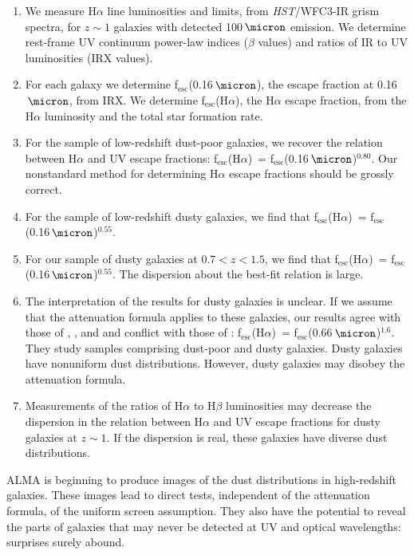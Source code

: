 \documentclass[preprint]{aastex}
\newcommand{\alephuv}{f$_{\mathrm{esc}}$(0.16$\,\micron$)}
\newcommand{\alephha}{f$_{\mathrm{esc}}$(H$\alpha$)}
\newcommand{\alephuvha}{f$_{\mathrm{esc}}$(0.66$\,\micron$)}
\begin{document}
\begin{enumerate}
\item We measure H$\alpha$ line luminosities and limits, from
\emph{HST}/WFC3-IR grism spectra, for $z \sim 1$ galaxies with detected
100$\,\micron$ emission.  We determine rest-frame UV continuum power-law
indices ($\beta$ values) and ratios of IR to UV luminosities (IRX values).
\item For each galaxy we determine \alephuv, the escape fraction at
0.16$\,\micron$, from IRX.  We determine \alephha, the H$\alpha$ escape
fraction, from the H$\alpha$ luminosity and the total star formation rate.
\item For the \citet{overzier11} sample of low-redshift dust-poor galaxies, we
recover the \citet{calzetti97b} relation between H$\alpha$ and UV escape
fractions: \alephha~= \alephuv$^{0.80}$.  Our nonstandard method for determining
H$\alpha$ escape fractions should be grossly correct.
\item For the \citet{hwang13} sample of low-redshift dusty galaxies, we find
that \alephha~= \alephuv$^{0.55}$.
\item For our sample of dusty galaxies at $0.7 < z < 1.5$, we find that
\alephha~= \alephuv$^{0.55}$.  The dispersion about the best-fit relation is
large.
\item The interpretation of the results for dusty galaxies is unclear.  If we
assume that the \citet{calzetti00} attenuation formula applies to these
galaxies, our results agree with those of \citet{onodera10}, \citet{kashino13},
and \citet{price13} and conflict with those of \citet{erb06}: \alephha~=
\alephuvha$^{1.6}$.  They study
samples comprising dust-poor and dusty galaxies.  Dusty galaxies have
nonuniform dust distributions.  However, dusty galaxies may disobey the
\citet{calzetti00} attenuation formula.
\item Measurements of the ratios of H$\alpha$ to H$\beta$ luminosities may
decrease the dispersion in the relation between H$\alpha$ and UV escape
fractions for dusty galaxies at $z \sim 1$.  If the dispersion is real, these
galaxies have diverse dust distributions.
\end{enumerate}

ALMA is beginning to produce images of the dust distributions in high-redshift
galaxies.  These images lead to direct tests, independent of the attenuation
formula, of the uniform screen assumption.  They also have the potential to
reveal the parts of galaxies that may never be detected at UV and optical
wavelengths: surprises surely abound.
\end{document}
